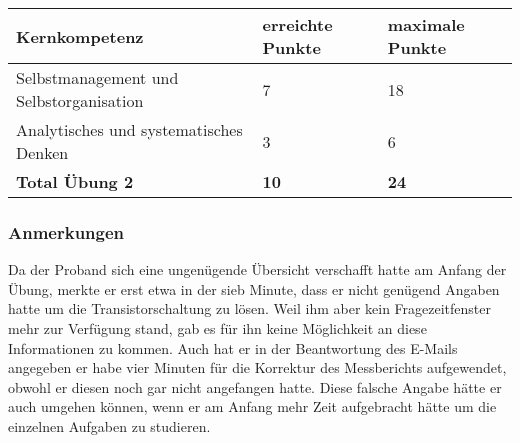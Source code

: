 \begin{center}
  \begin{tabular}{ | p{7cm} | p{3cm} | p{3cm} |}
   \hline
   \textbf{Kernkompetenz} & \textbf{erreichte Punkte} & \textbf{maximale Punkte} \\ \hline
   Selbstmanagement und Selbstorganisation & 7 & 18\\ \hline
   Analytisches und systematisches Denken & 3 & 6\\ \hline
   \textbf{Total Übung 2} & \textbf{10} & \textbf{24}\\ \hline
  \end{tabular}
\end{center}

\subsubsection{Anmerkungen}
Da der Proband sich eine ungenügende Übersicht verschafft hatte am Anfang der Übung, merkte er erst etwa in der sieb Minute, dass er nicht genügend Angaben hatte um die Transistorschaltung zu lösen. Weil ihm aber kein Fragezeitfenster mehr zur Verfügung stand, gab es für ihn keine Möglichkeit an diese Informationen zu kommen. Auch hat er in der Beantwortung des E-Mails angegeben er habe vier Minuten für die Korrektur des Messberichts aufgewendet, obwohl er diesen noch gar nicht angefangen hatte. Diese falsche Angabe hätte er auch umgehen können, wenn er am Anfang mehr Zeit aufgebracht hätte um die einzelnen Aufgaben zu studieren.